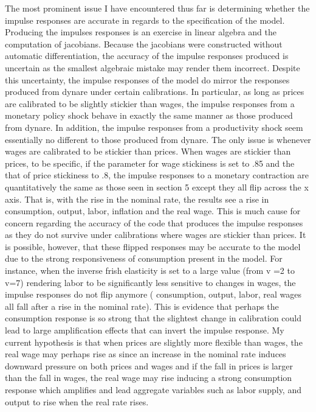 \documentclass[titlepage]{\econtex}\providecommand{\texname}{BufferStockTheory}
\begin{document}
The most prominent issue I have encountered thus far is determining whether the impulse responses are accurate in regards to the specification of the model. Producing the impulses responses is an exercise in linear algebra and the computation of jacobians. Because the jacobians were constructed without automatic differentiation, the accuracy of the impulse responses produced is uncertain as the smallest algebraic mistake may render them incorrect. Despite this uncertainty, the impulse responses of the model do mirror the responses produced from dynare under certain calibrations.  In particular, as long as prices are calibrated to be slightly stickier than wages, the impulse responses from a monetary policy shock behave in exactly the same manner as those produced from dynare. In addition, the impulse responses from a productivity shock seem essentially no different to those produced from dynare. The only issue is whenever wages are calibrated to be stickier than prices. When wages are stickier than prices,  to be specific, if the parameter for wage stickiness is set to .85 and the that of price stickiness to .8, the impulse responses to a monetary contraction are quantitatively the same as those seen in section 5 except they all flip across the x axis. That is, with the rise in the nominal rate, the results see a rise in consumption, output, labor, inflation and the real wage. This is much cause for concern regarding the accuracy of the code that produces the impulse responses as they do not survive under calibrations where wages are stickier than prices. It is possible, however, that these flipped responses may be accurate to the model due to the strong responsiveness of consumption present in the model. For instance, when the inverse frish elasticity is set to a large value (from v =2 to v=7) rendering labor to be significantly less sensitive to changes in wages, the impulse responses do not flip anymore ( consumption, output, labor, real wages all fall after a rise in the nominal rate). This is evidence that perhaps the consumption response is so strong that the slightest change in calibration could lead to large amplification effects that can invert the impulse response. My current hypothesis is that when prices are slightly more flexible than wages, the real wage may perhaps rise as since an increase in the nominal rate induces downward pressure on both prices and wages and if the fall in prices is larger than the fall in wages, the real wage may rise inducing a strong consumption response which amplifies and lead aggregate variables such as labor supply, and output to rise when the real rate rises. 
\end{document}

